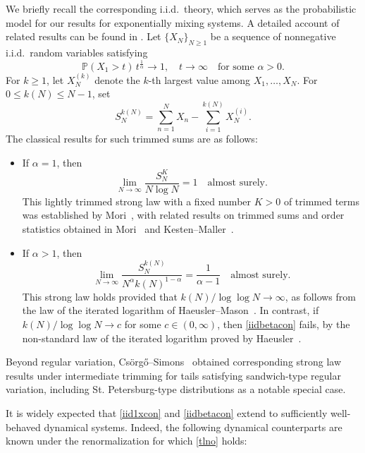 \documentclass[11pt,twoside,a4paper,reqno]{amsart}
\renewcommand{\P}{\mathbb{P}}
\begin{document}
We briefly recall the corresponding i.i.d.\ theory, which serves as the probabilistic model for our results for exponentially mixing systems. A detailed account of related results can be found in \cite{KessSchiSLLN}.
Let $\{X_N\}_{N \geq 1}$ be a sequence of nonnegative i.i.d.\ random variables satisfying
\begin{equation*}
\P(X_1>t)\,t^{\frac{1}{\alpha}}\to 1,\quad t\to\infty\quad \text{for some }\alpha>0.
\end{equation*}
For $k \geq 1$, let $X_N^{(k)}$ denote the $k$-th largest value among $X_1, \ldots, X_N$. For $0 \le k(N) \le N-1$, set
$$
S_N^{k(N)} = \sum_{n=1}^N X_n - \sum_{i=1}^{k(N)} X_N^{(i)}.
$$
The classical results for such trimmed sums are as follows:
\begin{itemize}
\item If $\alpha = 1$, then
\begin{equation}\label{iid1xcon}
\lim_{N\to\infty}\frac{S_N^K}{N\log N}=1
\quad\text{almost surely}.
\end{equation}
This lightly trimmed strong law with a fixed number $K>0$ of trimmed terms was established by Mori~\cite{mori2}, with related results on trimmed sums and order statistics obtained in Mori~\cite{morilighttrim} and Kesten--Maller~\cite{kesten1992ratios,km2}.
\item If $\alpha>1$, then
\begin{equation}\label{iidbetacon}
\lim_{N\to\infty} \frac{S_N^{k(N)}}{N^{\alpha} k(N)^{1-\alpha}}
= \frac{1}{\alpha - 1}
\quad\text{almost surely}.
\end{equation}
This strong law holds provided that $k(N)/\log\log N \to \infty$,  as follows from the law of the iterated logarithm of Haeusler--Mason~\cite{Haeusler_Mason_1987}. In contrast, if $k(N)/\log\log N \to c$ for some $c\in(0,\infty)$, then \eqref{iidbetacon} fails, by the non-standard law of the iterated logarithm proved by Haeusler~\cite{HaeuslernonstandardLIL}.
\end{itemize}
Beyond regular variation, Cs\"{o}rg\H{o}--Simons~\cite{CS96} obtained corresponding strong law results under intermediate trimming for tails satisfying sandwich-type regular variation, including St. Petersburg-type distributions as a notable special case.



It is widely expected that \eqref{iid1xcon} and \eqref{iidbetacon} extend to sufficiently well-behaved dynamical systems. Indeed, the following dynamical counterparts are known under the renormalization for which \eqref{tlno} holds:
\end{document}
